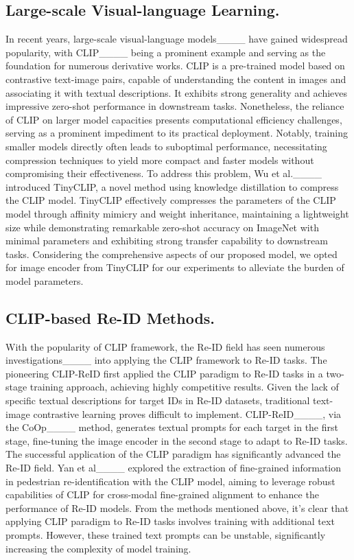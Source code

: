 \subsection{Large-scale Visual-language Learning.}
In recent years, large-scale visual-language models____ have gained widespread popularity, with CLIP____ being a prominent example and serving as the foundation for numerous derivative works. CLIP is a pre-trained model based on contrastive text-image pairs, capable of understanding the content in images and associating it with textual descriptions. It exhibits strong generality and achieves impressive zero-shot performance in downstream tasks. Nonetheless, the reliance of CLIP on larger model capacities presents computational efficiency challenges, serving as a prominent impediment to its practical deployment. Notably, training smaller models directly often leads to suboptimal performance, necessitating compression techniques to yield more compact and faster models without compromising their effectiveness.
To address this problem, Wu et al.____ introduced TinyCLIP, a novel method using knowledge distillation to compress the CLIP model. TinyCLIP effectively compresses the parameters of the CLIP model through affinity mimicry and weight inheritance, maintaining a lightweight size while demonstrating remarkable zero-shot accuracy on ImageNet with minimal parameters and exhibiting strong transfer capability to downstream tasks.
Considering the comprehensive aspects of our proposed model, we opted for image encoder from TinyCLIP for our experiments to alleviate the burden of model parameters.

\subsection{CLIP-based Re-ID Methods.}
With the popularity of CLIP framework, the Re-ID field has seen numerous investigations____ into applying the CLIP framework to Re-ID tasks. The pioneering CLIP-ReID first applied the CLIP paradigm to Re-ID tasks in a two-stage training approach, achieving highly competitive results. Given the lack of specific textual descriptions for target IDs in Re-ID datasets, traditional text-image contrastive learning proves difficult to implement. CLIP-ReID____, via the CoOp____ method, generates textual prompts for each target in the first stage, fine-tuning the image encoder in the second stage to adapt to Re-ID tasks. The successful application of the CLIP paradigm has significantly advanced the Re-ID field. Yan et al____ explored the extraction of fine-grained information in pedestrian re-identification with the CLIP model, aiming to leverage robust capabilities of CLIP for cross-modal fine-grained alignment to enhance the performance of Re-ID models. 
From the methods mentioned above, it's clear that applying CLIP paradigm to Re-ID tasks involves training with additional text prompts. However, these trained text prompts can be unstable, significantly increasing the complexity of model training.

